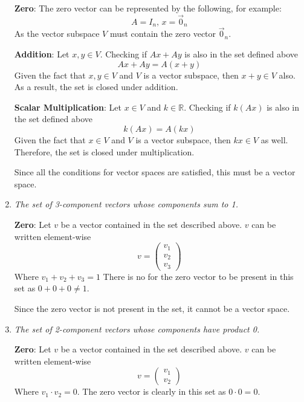 \documentclass{article}
\begin{document}
\begin{enumerate}
    \bigbreak

    {\bf Zero}: The zero vector can be represented by the following, for example:
    $$ A = I_n,\, x = \vec{0}_n $$
    As the vector subspace $ V $ must contain the zero vector $ \vec{0}_n $.
    
    \bigbreak

    {\bf Addition}: Let $ x, y \in V $. Checking if $ Ax + Ay $ is also in
    the set defined above
    $$ Ax + Ay = A (x + y) $$
    Given the fact that $ x, y \in V $ and $ V $ is a vector subspace, then $
    x + y \in V $ also. As a result, the set is closed under addition.

    \bigbreak

    {\bf Scalar Multiplication}: Let $ x \in V $ and $ k \in \mathbb{R} $.
    Checking if $ k (Ax) $ is also in the set defined above
    $$ k (Ax) = A (kx) $$
    Given the fact that $ x \in V $ and $ V $ is a vector subspace, then $ kx
    \in V $ as well. Therefore, the set is closed under multiplication.

    \bigbreak

    Since all the conditions for vector spaces are satisfied, this must be a
    vector space.

    \item \textit{The set of 3-component vectors whose components sum to 1.}

    \bigbreak

    {\bf Zero}: Let $ v $ be a vector contained in the set described above.
    $ v $ can be written element-wise
    $$ v = \begin{pmatrix}
        v_1 \\
        v_2 \\
        v_3
    \end{pmatrix} $$
    Where $ v_1 + v_2 + v_3 = 1 $ There is no for the zero vector to be
    present in this set as $ 0 + 0 + 0 \neq 1 $.

    \bigbreak

    Since the zero vector is not present in the set, it cannot be a vector
    space.

    \item \textit{The set of 2-component vectors whose components have product 0.}

    \bigbreak

    {\bf Zero}: Let $ v $ be a vector contained in the set described above. $
    v $ can be written element-wise
    $$ v = \begin{pmatrix}
        v_1 \\
        v_2
    \end{pmatrix} $$
    Where $ v_1 \cdot v_2 = 0 $. The zero vector is clearly in this set as $
    0 \cdot 0 = 0 $.


\end{enumerate}
\end{document}
